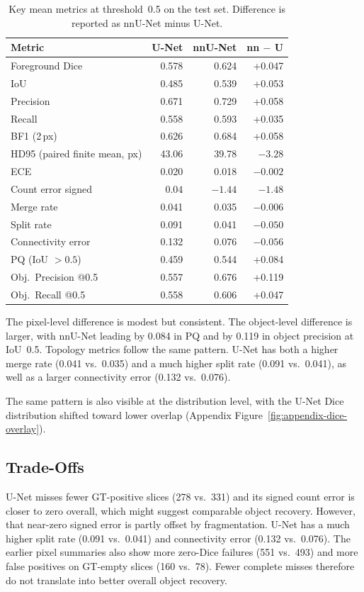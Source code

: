 \documentclass[logo,bsc,singlespacing,parskip,online]{infthesis}
\begin{document}
\begin{table}[!htbp]
\centering
\normalsize
\renewcommand{\arraystretch}{1.08}
\caption{Key mean metrics at threshold~0.5 on the test set. Difference is
  reported as nnU-Net minus U-Net.}
\label{tab:model-comparison}
\begin{tabular}{lrrr}
\toprule
\textbf{Metric} & \textbf{U-Net} & \textbf{nnU-Net} & \textbf{nn $-$ U} \\
\midrule
Foreground Dice         & 0.578 & 0.624 & +0.047 \\
IoU                     & 0.485 & 0.539 & +0.053 \\
Precision               & 0.671 & 0.729 & +0.058 \\
Recall                  & 0.558 & 0.593 & +0.035 \\
BF1 (2\,px)             & 0.626 & 0.684 & +0.058 \\
HD95 (paired finite mean, px)  & 43.06 & 39.78 & $-3.28$ \\
ECE                     & 0.020 & 0.018 & $-0.002$ \\
Count error signed      & $0.04$ & $-1.44$ & $-1.48$ \\
Merge rate              & 0.041 & 0.035 & $-0.006$ \\
Split rate              & 0.091 & 0.041 & $-0.050$ \\
Connectivity error      & 0.132 & 0.076 & $-0.056$ \\
PQ (IoU $>0.5$)         & 0.459 & 0.544 & +0.084 \\
Obj.\ Precision @0.5    & 0.557 & 0.676 & +0.119 \\
Obj.\ Recall @0.5       & 0.558 & 0.606 & +0.047 \\
\bottomrule
\end{tabular}
\end{table}

The pixel-level difference is modest but consistent. The object-level
difference is larger, with nnU-Net leading by 0.084 in PQ and by 0.119 in
object precision at IoU~0.5. Topology metrics
follow the same pattern. U-Net has both a
higher merge rate (0.041 vs.\ 0.035) and a much higher split rate (0.091 vs.\
0.041), as well as a larger connectivity error (0.132 vs.\ 0.076).

The same pattern is also visible at the distribution level, with the U-Net Dice
distribution shifted toward lower overlap (Appendix
Figure~\ref{fig:appendix-dice-overlay}).

\subsection{Trade-Offs}
U-Net misses fewer GT-positive slices (278 vs.\ 331) and its signed count
error is closer to zero overall, which might suggest comparable object
recovery. However, that near-zero signed error is partly offset by
fragmentation. U-Net has a much
higher split rate (0.091 vs.\ 0.041) and connectivity error (0.132 vs.\
0.076). The earlier pixel summaries also show more zero-Dice failures (551
vs.\ 493) and more false positives on GT-empty slices (160 vs.\ 78). Fewer
complete misses therefore do not translate into better overall object
recovery.
\end{document}

